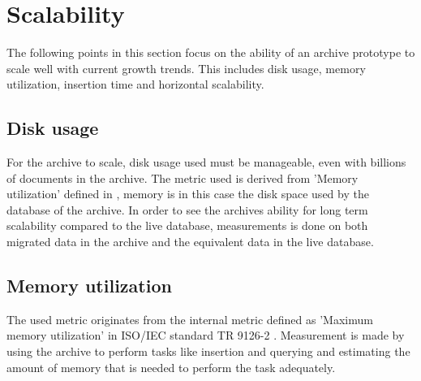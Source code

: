 %

\section{Scalability}
The following points in this section focus on the ability of an archive prototype to scale well with current growth trends. This includes disk usage, memory utilization, insertion time and horizontal scalability.

\subsection{Disk usage}
For the archive to scale, disk usage used must be manageable, even with billions of documents in the archive. The metric used is derived from 'Memory utilization' defined in \cite{isoInternalMetric}, memory is in this case the disk space used by the database of the archive. In order to see the archives ability for long term scalability compared to the live database, measurements is done on both migrated data in the archive and the equivalent data in the live database.               

\subsection{Memory utilization}
The used metric originates from the internal metric defined as 'Maximum memory utilization' in ISO/IEC standard TR 9126-2 \cite{isoExternalMetric}. Measurement is made by using the archive to perform tasks like insertion and querying and estimating the amount of memory that is needed to perform the task adequately. 


